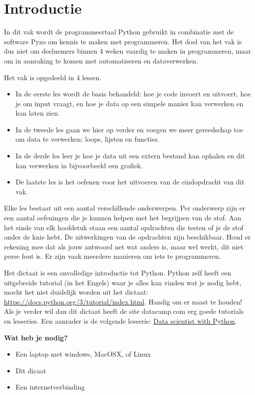 \chapter*{Introductie}
In dit vak wordt de programmeertaal Python gebruikt in combinatie met de software Pyzo om kennis te maken met programmeren. Het doel van het vak is dus niet om deelnemers binnen 4 weken vaardig te maken in programmeren, maar om in aanraking te komen met automatiseren en dataverwerken. 



Het vak is opgedeeld in 4 lessen.
\begin{itemize}
\item In de eerste les wordt de basis behandeld: hoe je code invoert en uitvoert, hoe je om input vraagt, en hoe je data op een simpele manier kan verwerken en kan laten zien. 
\item In de tweede les gaan we hier op verder en voegen we meer gereedschap toe om data te verwerken: loops, lijsten en functies. 
\item In de derde les leer je hoe je data uit een extern bestand kan ophalen en dit kan verwerken in bijvoorbeeld een grafiek. 
\item De laatste les is het oefenen voor het uitvoeren van de eindopdracht van dit vak. 
\end{itemize}

Elke les bestaat uit een aantal verschillende onderwerpen. Per onderwerp zijn er een aantal oefeningen die je kunnen helpen met het begrijpen van de stof. Aan het einde van elk hoofdstuk staan een aantal opdrachten die testen of je de stof onder de knie hebt. De uitwerkingen van de opdrachten zijn beschikbaar. Houd er rekening mee dat als jouw antwoord net wat anders is, maar wel werkt, dit niet perse fout is. Er zijn vaak meerdere manieren om iets te programmeren.

Het dictaat is een onvolledige introductie tot Python. Python zelf heeft een uitgebreide tutorial (in het Engels) waar je alles kan vinden wat je nodig hebt, mocht het niet duidelijk worden uit het dictaat: \href{https://docs.python.org/3/tutorial/index.html}{https://docs.python.org/3/tutorial/index.html}. Handig om er naast te houden! Als je verder wil dan dit dictaat heeft de site datacamp.com erg goede tutorials en lesseries. Een aanrader is de volgende lesserie:
\href{https://www.datacamp.com/tracks/data-scientist-with-python}{Data scientist with Python}.

\textbf{Wat heb je nodig?}
\begin{itemize}
\item Een laptop met windows, MacOSX, of Linux
\item Dit dicaat
\item Een internetverbinding
\end{itemize}

